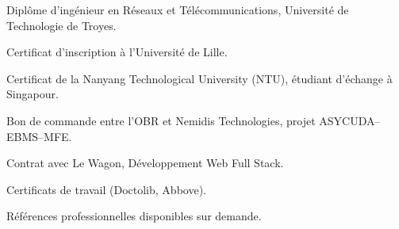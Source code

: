 
\begin{cvdetailmissions}
  \item {Diplôme d'ingénieur en Réseaux et Télécommunications, Université de Technologie de Troyes.}
  \item {Certificat d'inscription à l'Université de Lille.}
  \item {Certificat de la Nanyang Technological University (NTU), étudiant d'échange à Singapour.}
  \item {Bon de commande entre l'OBR et Nemidis Technologies, projet ASYCUDA–EBMS–MFE.}
  \item {Contrat avec Le Wagon, Développement Web Full Stack.}
  \item {Certificats de travail (Doctolib, Abbove).}
  \item {Références professionnelles disponibles sur demande.}
\end{cvdetailmissions}
